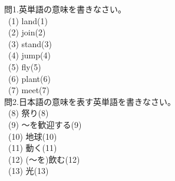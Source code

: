 \documentclass[uplatex]{jsarticle}
\title{\vspace{-30mm}\flushleft{\huge{第4回\ (\ \ 月\ \ 日)\ Unit8〜10}}}
\author{\Large{\hspace{90mm}名前\hspace{40mm}得点\hspace{20mm}点}}
\date{\empty}
\begin{document}
\maketitle
\vspace{-10mm}
\Large 問1.英単語の意味を書きなさい。\\
\large\ (1) land\hspace{10mm}\hspace{\fill}(1)\underline{\hspace{35mm}}\\
\ (2) join\hspace{\fill}(2)\underline{\hspace{35mm}}\\
\ (3) stand\hspace{\fill}(3)\underline{\hspace{35mm}}\\
\ (4) jump\hspace{\fill}(4)\underline{\hspace{35mm}}\\
\ (5) fly\hspace{\fill}(5)\underline{\hspace{35mm}}\\
\ (6) plant\hspace{\fill}(6)\underline{\hspace{35mm}}\\
\ (7) meet\hspace{\fill}(7)\underline{\hspace{35mm}}\\
\Large 問2.日本語の意味を表す英単語を書きなさい。\\
\large\ (8) 祭り\hspace{\fill}(8)\underline{\hspace{35mm}}\\
\ (9) 〜を歓迎する\hspace{\fill}(9)\underline{\hspace{35mm}}\\
\ (10) 地球\hspace{\fill}(10)\underline{\hspace{35mm}}\\
\ (11) 動く\hspace{\fill}(11)\underline{\hspace{35mm}}\\
\ (12) (〜を)飲む\hspace{\fill}(12)\underline{\hspace{35mm}}\\
\ (13) 光\hspace{\fill}(13)\underline{\hspace{35mm}}\\
\end{document}
